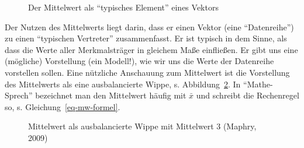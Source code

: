 \documentclass[
  letterpaper,
  oneside,
  open=any]{scrbook}
\theoremstyle{definition}
\theoremstyle{definition}
\theoremstyle{definition}
\theoremstyle{remark}
\begin{document}
\begin{figure}


\caption{\label{fig-mw2}Der Mittelwert als \enquote{typisches Element}
eines Vektors}

\end{figure}%

Der Nutzen des Mittelwerts liegt darin, dass er einen Vektor (eine
\enquote{Datenreihe}) zu einen \enquote{typischen Vertreter}
zusammenfasst. Er ist typisch in dem Sinne, als dass die Werte aller
Merkmalsträger in gleichem Maße einfließen. Er gibt uns eine (mögliche)
Vorstellung (ein Modell!), wie wir uns die Werte der Datenreihe
vorstellen sollen. Eine nützliche Anschauung zum Mittelwert ist die
Vorstellung des Mittelwerts als eine ausbalancierte Wippe, s.
Abbildung~\ref{fig-wippe}. In \enquote{Mathe-Sprech} bezeichnet man den
Mittelwert häufig mit \(\bar{x}\) und schreibt die Rechenregel so, s.
Gleichung~\ref{eq-mw-formel}.

\begin{figure}


\caption{\label{fig-wippe}Mittelwert als ausbalancierte Wippe mit
Mittelwert 3 (Maphry, 2009)}

\end{figure}%
\end{document}
